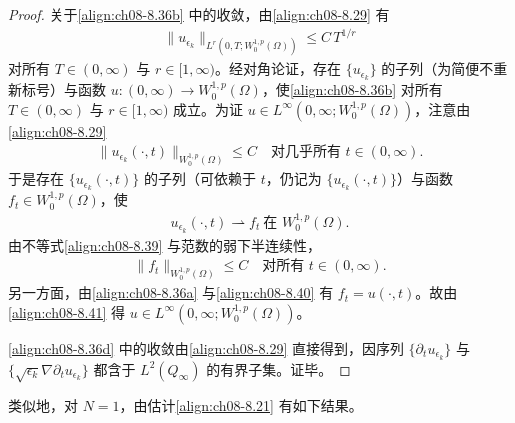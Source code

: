 \documentclass[../../main.tex]{subfiles}%
\begin{document}
\begin{proof}
关于\eqref{align:ch08-8.36b} 中的收敛，由\eqref{align:ch08-8.29} 有
\begin{align}
\|u_{\epsilon_k}\|_{L^r(0,T;W^{1,p}_0(\Omega))}\leqslant C\,T^{1/r} \label{align:ch08-8.38}
\end{align}
对所有 $T\in(0,\infty)$ 与 $r\in[1,\infty)$。经对角论证，存在 $\{u_{\epsilon_k}\}$ 的子列（为简便不重新标号）与函数 $u:(0,\infty)\to W^{1,p}_0(\Omega)$，使\eqref{align:ch08-8.36b} 对所有 $T\in(0,\infty)$ 与 $r\in[1,\infty)$ 成立。为证 $u\in L^\infty(0,\infty;W^{1,p}_0(\Omega))$，注意由\eqref{align:ch08-8.29}
\begin{align}
\|u_{\epsilon_k}(\cdot,t)\|_{W^{1,p}_0(\Omega)}\leqslant C\quad\text{对几乎所有 }t\in(0,\infty). \label{align:ch08-8.39}
\end{align}
于是存在 $\{u_{\epsilon_k}(\cdot,t)\}$ 的子列（可依赖于 $t$，仍记为 $\{u_{\epsilon_k}(\cdot,t)\}$）与函数 $f_t\in W^{1,p}_0(\Omega)$，使
\begin{align}
u_{\epsilon_k}(\cdot,t)\rightharpoonup f_t\ \text{在 }W^{1,p}_0(\Omega). \label{align:ch08-8.40}
\end{align}
由不等式\eqref{align:ch08-8.39} 与范数的弱下半连续性，
\begin{align}
\|f_t\|_{W^{1,p}_0(\Omega)}\leqslant C\quad\text{对所有 }t\in(0,\infty). \label{align:ch08-8.41}
\end{align}
另一方面，由\eqref{align:ch08-8.36a} 与\eqref{align:ch08-8.40} 有 $f_t=u(\cdot,t)$。故由\eqref{align:ch08-8.41} 得 $u\in L^\infty(0,\infty;W^{1,p}_0(\Omega))$。

\eqref{align:ch08-8.36d} 中的收敛由\eqref{align:ch08-8.29} 直接得到，因序列 $\{\partial_t u_{\epsilon_k}\}$ 与 $\{\sqrt{\epsilon_k}\nabla\partial_t u_{\epsilon_k}\}$ 都含于 $L^2(Q_\infty)$ 的有界子集。证毕。
\end{proof}

类似地，对 $N=1$，由估计\eqref{align:ch08-8.21} 有如下结果。
\end{document}
